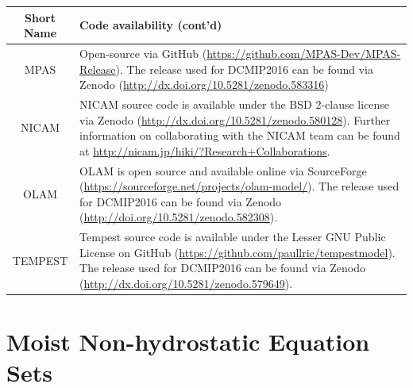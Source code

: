\documentclass[gmd, manuscript]{copernicus}
\begin{document}
\begin{center}
\begin{tabular}{cp{5in}}
\hline Short Name & Code availability (cont'd) \\ \hline 
MPAS & Open-source via GitHub (\url{https://github.com/MPAS-Dev/MPAS-Release}).  The release used for DCMIP2016 can be found via Zenodo (\mbox{\url{http://dx.doi.org/10.5281/zenodo.583316}}) \\
NICAM & NICAM source code is available under the BSD 2-clause license via Zenodo (\mbox{\url{http://dx.doi.org/10.5281/zenodo.580128}}).  Further information on collaborating with the NICAM team can be found at \mbox{\url{http://nicam.jp/hiki/?Research+Collaborations}}. \\
OLAM & OLAM is open source and available online via SourceForge (\url{https://sourceforge.net/projects/olam-model/}).  The release used for DCMIP2016 can be found via Zenodo (\mbox{\url{http://doi.org/10.5281/zenodo.582308}}). \\
TEMPEST & Tempest source code is available under the Lesser GNU Public License on GitHub (\mbox{\url{https://github.com/paullric/tempestmodel}}).  The release used for DCMIP2016 can be found via Zenodo (\mbox{\url{http://dx.doi.org/10.5281/zenodo.579649}}). \\
\hline 
\end{tabular}
\end{center}

\clearpage


\appendix

\section{Moist Non-hydrostatic Equation Sets} \label{sec:EquationSets}

\end{document}
